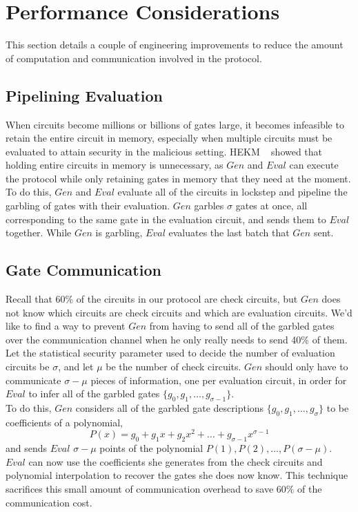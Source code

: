 \documentclass{article}
\begin{document}
\section{Performance Considerations}
This section details a couple of engineering improvements to reduce the amount of computation and communication involved in the protocol.

\subsection{Pipelining Evaluation}
When circuits become millions or billions of gates large, it becomes infeasible to retain the entire circuit in memory, especially when multiple circuits must be evaluated to attain security in the malicious setting. HEKM ~\cite{HEKM} showed that holding entire circuits in memory is unnecessary, as $Gen$ and $Eval$ can execute the protocol while only retaining gates in memory that they need at the moment. To do this, $Gen$ and $Eval$ evaluate all of the circuits in lockstep and pipeline the garbling of gates with their evaluation. $Gen$ garbles $\sigma$ gates at once, all corresponding to the same gate in the evaluation circuit, and sends them to $Eval$ together. While $Gen$ is garbling, $Eval$ evaluates the last batch that $Gen$ sent. 


\subsection{Gate Communication}

Recall that 60\% of the circuits in our protocol are check circuits, but $Gen$ does not know which circuits are check circuits and which are evaluation circuits. We'd like to find a way to prevent $Gen$ from having to send all of the garbled gates over the communication channel when he only really needs to send 40\% of them. Let the statistical security parameter used to decide the number of evaluation circuits be $\sigma$, and let $\mu$ be the number of check circuits. $Gen$ should only have to communicate $\sigma - \mu$ pieces of information, one per evaluation circuit, in order for $Eval$ to infer all of the garbled gates $\{g_{0}, g_{1}, \dots, g_{\sigma -1} \}$.\\

To do this, $Gen$ considers all of the garbled gate descriptions $\{g_{0}, g_{1}, \dots, g_{\sigma} \}$ to be coefficients of a polynomial, $$P(x) = g_{0} + g_{1}x + g_{2}x^{2} + \dots + g_{\sigma-1}x^{\sigma-1}$$ and sends $Eval$ $\sigma - \mu$ points of the polynomial $P(1), P(2), \dots , P(\sigma - \mu)$.  $Eval$ can now use the coefficients she generates from the check circuits and polynomial interpolation to recover the gates she does now know. This technique sacrifices this small amount of communication overhead to save 60\% of the communication cost.
\end{document}
